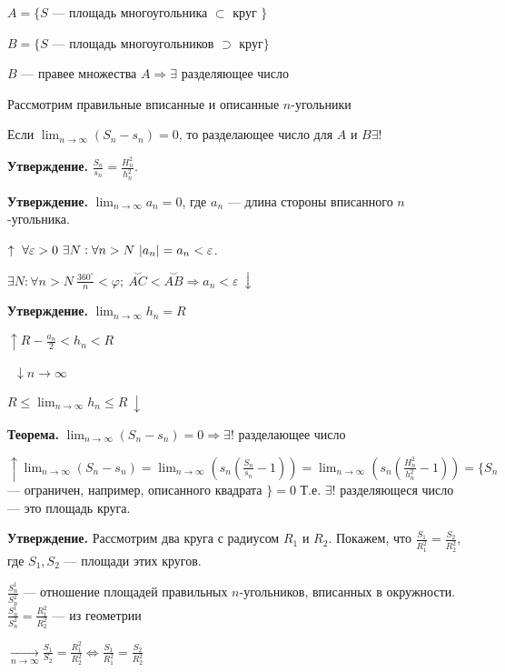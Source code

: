 \documentclass{article}
\begin{document}
    \(A = \{S\) --- площадь многоугольника \(\subset\) круг \(\}\)


    \( B = \{S \) --- площадь многоугольников \(\supset\) круг\(\}\)
    
    \( B \) --- правее множества \(A \Rightarrow \exists\) разделяющее число

    Рассмотрим правильные вписанные и описанные \(n\)-угольники

    Если \(\lim_{n \to \infty}(S_n-s_n) = 0\), то разделающее число для \(A\) и \(B \exists !\)

    \textbf{Утверждение.} \(\frac{S_n}{s_n} = \frac{H_n^2}{h_n^2}\).

    \textbf{Утверждение.} \(\lim_{n \to \infty} a_n = 0\), где \(a_n\) --- длина стороны вписанного \(n\)-угольника.

    \(\uparrow\ \forall \varepsilon > 0\ \exists N : \forall n > N\ \abs{a_n}=a_n < \varepsilon\).

    \(\exists N : \forall n > N\ \frac{360^\circ}{n} < \varphi;\ \overset{\smile}{AC} < \overset{\smile}{AB} \Rightarrow a_n < \varepsilon\ \downarrow\)
    
    \textbf{Утверждение.} \(\lim_{n \to \infty} h_n = R\)

    \(\uparrow R - \frac{a_n}{2} < h_n < R \)
    
    \quad \quad \quad \quad \quad \ \(\downarrow n \to \infty\)
    
    \(R \leq \lim_{n \to \infty} h_n \leq R\ \downarrow\)


    \textbf{Теорема.} \(\lim_{n \to \infty} (S_n - s_n) = 0 \Rightarrow \exists!\) разделающее число
    
    \(\uparrow \lim_{n \to \infty} (S_n - s_n) = \lim_{n \to \infty} (s_n(\frac{S_n}{s_n} - 1)) = \lim_{n \to \infty} (s_n(\frac{H^2_n}{h^2_n} - 1)) =\{S_n\) --- ограничен, например, описанного квадрата \(\} = 0\) 
    Т.е. \(\exists ! \) разделяющеся число — это площадь круга.
 
    \textbf{Утверждение.} Рассмотрим два круга с радиусом \(R_1\) и \(R_2\). Покажем, что \(\frac{S_1}{R_1^2} = \frac{S_2}{R_2^2}\), где \(S_1, S_2\) --- площади этих кругов.
    

    \(\frac{S^1_n}{S^2_n}\) --- отношение площадей правильных $n$-угольников, вписанных в окружности.
    \(\frac{S^1_n}{S^2_n} = \frac{R^2_1}{R^2_2}\) --- из геометрии

    \(\underset{n \to \infty}{\longrightarrow} \frac{S_1}{S_2} = \frac{R^2_1}{R^2_2} \Leftrightarrow \frac{S_1}{R^2_1} = \frac{S_2}{R^2_2}\)



    
    
\end{document}
